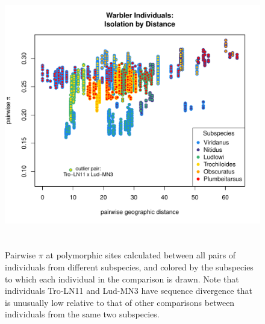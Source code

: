 \documentclass[12pt]{article}
\begin{document}
\begin{figure}
\centering
	{\includegraphics[width=5in,height=4.3in]{figs/warblers/warb_ind_pairwise_pi.pdf}}
	\caption{Pairwise $\pi$ at polymorphic sites calculated between all pairs of individuals from different subspecies, and colored by the subspecies to which each individual in the comparison is drawn.  Note that individuals Tro-LN11 and Lud-MN3 have sequence divergence that is unusually low relative to that of other comparisons between individuals from the same two subspecies.}\label{sfig:warb_ind_pwp}
\end{figure}
\end{document}
